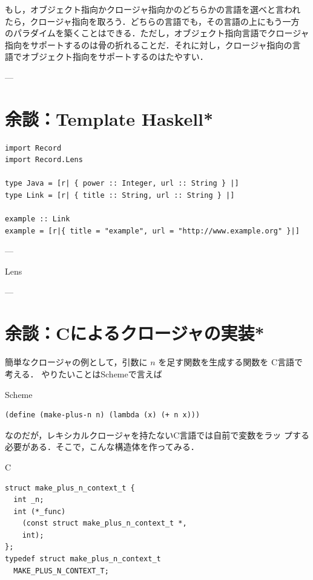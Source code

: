 \documentclass[a5paper,twoside,fleqn]{jsbook}
\newcommand{\programminglanguage}[1]{\textsf{#1}}
\newcommand{\clang}{\programminglanguage{C}}
\newcommand{\haskell}{\programminglanguage{Haskell}}
\newcommand{\scheme}{\programminglanguage{Scheme}}
\newenvironment{ccode}{\begin{itembox}[r]{\clang}}{\end{itembox}}
\newenvironment{schemecode}{\begin{itembox}[r]{\scheme}}{\end{itembox}}
\begin{document}
もし，オブジェクト指向かクロージャ指向かのどちらかの言語を選べと言われ
たら，クロージャ指向を取ろう．どちらの言語でも，その言語の上にもう一方
のパラダイムを築くことはできる．ただし，オブジェクト指向言語でクロージャ
指向をサポートするのは骨の折れることだ．それに対し，クロージャ指向の言
語でオブジェクト指向をサポートするのはたやすい．

---

\section{余談：Template \haskell*}

\begin{verbatim}
import Record
import Record.Lens

type Java = [r| { power :: Integer, url :: String } |]
type Link = [r| { title :: String, url :: String } |]

example :: Link
example = [r|{ title = "example", url = "http://www.example.org" }|]
\end{verbatim}

---

Lens

---

\section*{余談：\clang によるクロージャの実装*}

簡単なクロージャの例として，引数に $n$ を足す関数を生成する関数を
\clang 言語で考える．
やりたいことは\scheme で言えば
\begin{schemecode}
\begin{verbatim}
(define (make-plus-n n) (lambda (x) (+ n x)))
\end{verbatim}
\end{schemecode}
なのだが，レキシカルクロージャを持たない\clang 言語では自前で変数をラッ
プする必要がある．そこで，こんな構造体を作ってみる．
\begin{ccode}
\begin{verbatim}
struct make_plus_n_context_t {
  int _n;
  int (*_func)
    (const struct make_plus_n_context_t *,
    int);
};
typedef struct make_plus_n_context_t
  MAKE_PLUS_N_CONTEXT_T;
\end{verbatim}
\end{ccode}
\end{document}
